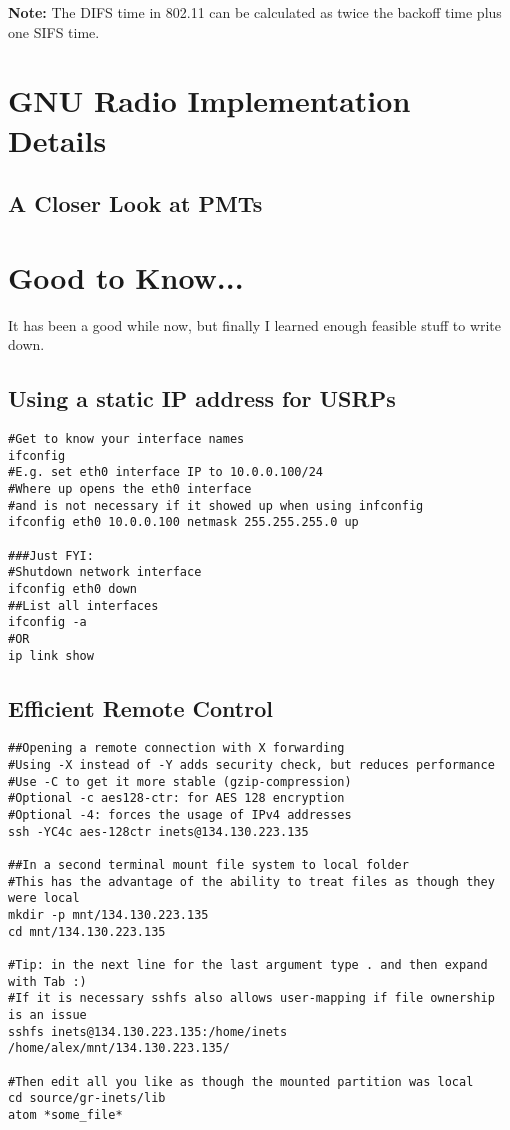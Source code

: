 \documentclass{article}
\begin{document}
\textbf{Note:} The DIFS time in 802.11 can be calculated as twice the backoff time plus one SIFS time.

\section{GNU Radio Implementation Details}

\subsection{A Closer Look at PMTs}

\section{Good to Know...}

It has been a good while now, but finally I learned enough feasible stuff to write down.

\subsection{Using a static IP address for USRPs}
\begin{verbatim}
#Get to know your interface names
ifconfig 
#E.g. set eth0 interface IP to 10.0.0.100/24
#Where up opens the eth0 interface 
#and is not necessary if it showed up when using infconfig
ifconfig eth0 10.0.0.100 netmask 255.255.255.0 up

###Just FYI:
#Shutdown network interface
ifconfig eth0 down
##List all interfaces
ifconfig -a
#OR
ip link show
\end{verbatim}

\subsection{Efficient Remote Control}

\begin{verbatim}
##Opening a remote connection with X forwarding
#Using -X instead of -Y adds security check, but reduces performance
#Use -C to get it more stable (gzip-compression)
#Optional -c aes128-ctr: for AES 128 encryption
#Optional -4: forces the usage of IPv4 addresses
ssh -YC4c aes-128ctr inets@134.130.223.135

##In a second terminal mount file system to local folder
#This has the advantage of the ability to treat files as though they were local
mkdir -p mnt/134.130.223.135
cd mnt/134.130.223.135

#Tip: in the next line for the last argument type . and then expand with Tab :)
#If it is necessary sshfs also allows user-mapping if file ownership is an issue
sshfs inets@134.130.223.135:/home/inets /home/alex/mnt/134.130.223.135/

#Then edit all you like as though the mounted partition was local
cd source/gr-inets/lib
atom *some_file*

\end{verbatim}
\end{document}
